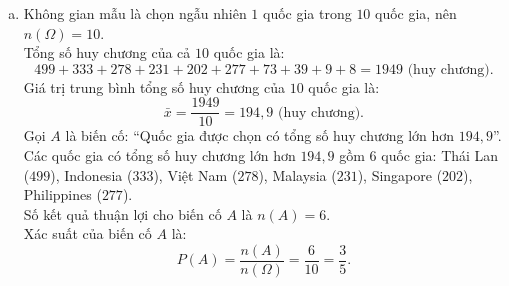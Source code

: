 \begin{bt}
{\begin{enumerate}[a)]
\begin{itemize}
		\item Việt Nam: $87 + 81 + 110 = 278$ huy chương.
		\item Malaysia: $57 + 57 + 117 = 231$ huy chương.
		\item Singapore: $52 + 61 + 89 = 202$ huy chương.
		\item Philippines: $50 + 73 + 154 = 277$ huy chương.
		\item Myanmar: $3 + 21 + 49 = 73$ huy chương.
		\item Lào: $2 + 9 + 28 = 39$ huy chương.
		\item Brunei: $1 + 3 + 5 = 9$ huy chương.
		\item Timor-Leste: $0 + 1 + 7 = 8$ huy chương.
	\end{itemize}
	\item Không gian mẫu là chọn ngẫu nhiên $1$ quốc gia trong $10$ quốc gia, nên $n(\Omega) = 10$.\\
	Tổng số huy chương của cả $10$ quốc gia là:
	$$499 + 333 + 278 + 231 + 202 + 277 + 73 + 39 + 9 + 8 = 1949\text{ (huy chương)}.$$
	Giá trị trung bình tổng số huy chương của $10$ quốc gia là:
	$$\bar{x} = \dfrac{1949}{10} = 194{,}9\text{ (huy chương)}.$$
	Gọi $A$ là biến cố: ``Quốc gia được chọn có tổng số huy chương lớn hơn $194{,}9$''.\\
	Các quốc gia có tổng số huy chương lớn hơn $194{,}9$ gồm $6$ quốc gia: Thái Lan ($499$), Indonesia ($333$), Việt Nam ($278$), Malaysia ($231$), Singapore ($202$), Philippines ($277$).\\
	Số kết quả thuận lợi cho biến cố $A$ là $n(A) = 6$.\\
	Xác suất của biến cố $A$ là:
	$$P(A) = \dfrac{n(A)}{n(\Omega)} = \dfrac{6}{10} = \dfrac{3}{5}.$$
\end{enumerate}
}
\end{bt}

